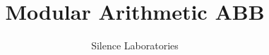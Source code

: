 \documentclass{article}
\begin{document}
\title{Modular Arithmetic ABB}
\author{Silence Laboratories}
\maketitle





\end{document}
